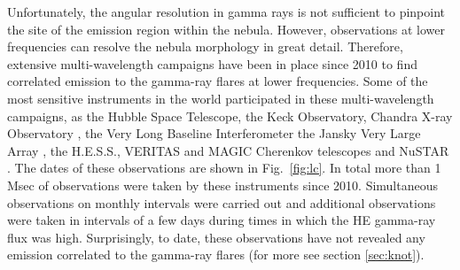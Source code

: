Unfortunately, the angular resolution in gamma rays is not sufficient to pinpoint the site of the emission region within the nebula. However, observations at lower frequencies can resolve the nebula morphology in great detail. Therefore, extensive multi-wavelength campaigns have been in place since 2010 to find correlated emission to the gamma-ray flares at lower frequencies. Some of the most sensitive instruments in the world participated in these multi-wavelength campaigns, as the Hubble Space Telescope, the Keck Observatory, Chandra X-ray Observatory \citep{Weisskopf2013,rudy2015}, the Very Long Baseline Interferometer \citep{Lobanov2011}  the Jansky Very Large Array \citep{Bietenholz2014}, the H.E.S.S., VERITAS and MAGIC Cherenkov telescopes \citep{Abramowski2014,Aliu2014,Aleksic2015} and NuSTAR \citep{Madsen2015}. The dates of these observations are shown in Fig.~\ref{fig:lc}. In total more than 1 Msec of observations were taken by these  instruments since 2010. Simultaneous observations on monthly intervals were carried out and additional observations were taken in intervals of a few days during times in which the HE gamma-ray flux was high. Surprisingly, to date, these observations have not revealed any emission correlated to the gamma-ray flares (for more see section \ref{sec:knot}). 
